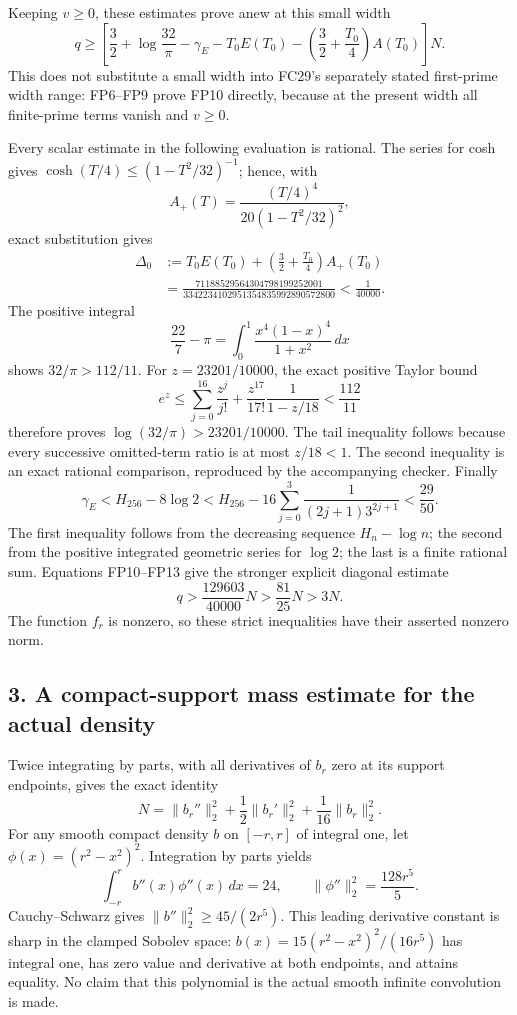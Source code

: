 \documentclass[
  10pt,
  a4paper,
]{article}
\begin{document}
Keeping \(v\ge0\), these estimates prove anew at this small width \[
 q\ge\left[
 \frac32+\log\frac{32}{\pi}-\gamma_E
 -T_0E(T_0)-\left(\frac32+\frac{T_0}{4}\right)A(T_0)
 \right]N.
 \tag{FP10}
\] This does not substitute a small width into FC29's separately stated
first-prime width range: FP6--FP9 prove FP10 directly, because at the
present width all finite-prime terms vanish and \(v\ge0\).

Every scalar estimate in the following evaluation is rational. The
series for cosh gives \(\cosh(T/4)\le(1-T^2/32)^{-1}\); hence, with \[
 A_+(T)=\frac{(T/4)^4}{20(1-T^2/32)^2},
\] exact substitution gives \[
 \begin{aligned}
 \Delta_0
 &:=
 T_0E(T_0)+\left(\frac32+\frac{T_0}{4}\right)A_+(T_0)\\
 &=\frac{71188529564304798199252001}
         {3342234102951354835992890572800}
 <\frac1{40000}.
 \end{aligned}
 \tag{FP11}
\] The positive integral \[
 \frac{22}{7}-\pi=\int_0^1\frac{x^4(1-x)^4}{1+x^2}\,dx
\] shows \(32/\pi>112/11\). For \(z=23201/10000\), the exact positive
Taylor bound \[
 e^z\le
 \sum_{j=0}^{16}\frac{z^j}{j!}
 +\frac{z^{17}}{17!}\frac1{1-z/18}
 <\frac{112}{11}
 \tag{FP12}
\] therefore proves \(\log(32/\pi)>23201/10000\). The tail inequality
follows because every successive omitted-term ratio is at most
\(z/18<1\). The second inequality is an exact rational comparison,
reproduced by the accompanying checker. Finally \[
 \gamma_E<H_{256}-8\log2
 <H_{256}
   -16\sum_{j=0}^3\frac1{(2j+1)3^{2j+1}}
 <\frac{29}{50}.
 \tag{FP13}
\] The first inequality follows from the decreasing sequence
\(H_n-\log n\); the second from the positive integrated geometric series
for \(\log2\); the last is a finite rational sum. Equations FP10--FP13
give the stronger explicit diagonal estimate \[
 \boxed{\displaystyle
 q>\frac{129603}{40000}N>\frac{81}{25}N>3N.}
 \tag{FP14}
\] The function \(f_r\) is nonzero, so these strict inequalities have
their asserted nonzero norm.

\subsection{3. A compact-support mass estimate for the actual
density}\label{a-compact-support-mass-estimate-for-the-actual-density}

Twice integrating by parts, with all derivatives of \(b_r\) zero at its
support endpoints, gives the exact identity \[
 N=\|b_r''\|_2^2+\frac12\|b_r'\|_2^2+\frac1{16}\|b_r\|_2^2.
 \tag{FP15}
\] For any smooth compact density \(b\) on \([-r,r]\) of integral one,
let \(\phi(x)=(r^2-x^2)^2\). Integration by parts yields \[
 \int_{-r}^r b''(x)\phi''(x)\,dx=24,\qquad
 \|\phi''\|_2^2=\frac{128r^5}{5}.
\] Cauchy--Schwarz gives \(\|b''\|_2^2\ge45/(2r^5)\). This leading
derivative constant is sharp in the clamped Sobolev space:
\(b(x)=15(r^2-x^2)^2/(16r^5)\) has integral one, has zero value and
derivative at both endpoints, and attains equality. No claim that this
polynomial is the actual smooth infinite convolution is made.
\end{document}
